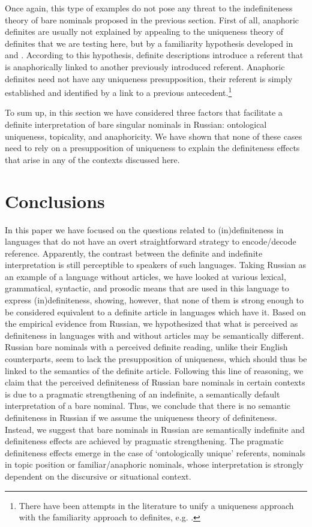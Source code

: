 \documentclass[output=paper,
colorlinks,
citecolor=brown,
newtxmath
]{langscibook}
\begin{document}
\noindent Once again, this type of examples do not pose any threat to the indefiniteness theory of bare nominals proposed in the previous section. First of all, anaphoric definites are usually not explained by appealing to the uniqueness theory of definites that we are testing here, but by a familiarity hypothesis developed in \citet{Kamp1981} and \citet{Heim1982}. According to this hypothesis, definite descriptions introduce a referent that is anaphorically linked to another previously introduced referent. Anaphoric definites need not have any uniqueness presupposition, their referent is simply established and identified by a link to a previous antecedent.\footnote{There have been attempts in the literature to unify a uniqueness approach with the familiarity approach to definites, e.g. \citet{farkas03}.}

To sum up, in this section we have considered three factors that facilitate a definite interpretation of bare singular nominals in Russian: ontological uniqueness, topicality, and anaphoricity. We have shown that none of these cases need to rely on a presupposition of uniqueness to explain the definiteness effects that arise in any of the contexts discussed here.

\section{Conclusions}
In this paper we have focused on the questions related to (in)definiteness in languages that do not have an overt straightforward strategy to encode/decode reference. Apparently, the contrast between the definite and indefinite interpretation is still perceptible to speakers of such languages. Taking Russian as an example of a language without articles, we have looked at various lexical, grammatical, syntactic, and prosodic means that are used in this language to express (in)definiteness, showing, however, that none of them is strong enough to be considered equivalent to a definite article in languages which have it. Based on the empirical evidence from Russian, we hypothesized that what is perceived as definiteness in languages with and without articles may be semantically different. Russian bare nominals with a perceived definite reading, unlike their English counterparts, seem to lack the presupposition of uniqueness, which should thus be linked to the semantics of
the definite article. Following this line of reasoning, we claim that the perceived definiteness of Russian bare nominals in certain contexts is due to a pragmatic strengthening of an indefinite, a semantically default interpretation of a bare nominal. Thus, we conclude that there is no semantic definiteness in Russian if we assume the uniqueness theory of definiteness. Instead, we suggest that bare nominals in Russian are semantically indefinite and definiteness effects are achieved by pragmatic strengthening. The pragmatic definiteness effects emerge in the case of `ontologically unique' referents, nominals in topic position or familiar/anaphoric nominals, whose interpretation is strongly dependent on the discursive or situational context.
\end{document}
